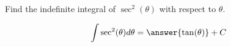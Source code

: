 \documentclass{ximera}
\author{Gregory Hartman \and Matthew Carr\and Nela Lakos}
\begin{document}
\begin{exercise}


Find the indefinite integral of $\sec^2(\theta)$ with respect to $\theta$.

\[
\int \sec^{2}(\theta) d\theta=\answer{\tan(\theta)}+C
\]


\end{exercise}
\end{document}
